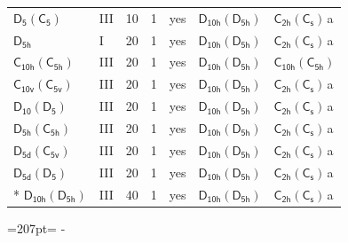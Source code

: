 \documentclass[10pt,a4paper]{article}
\newcommand{\needspace}[1]{\par\penalty-100\begingroup\dimen0=#1\relax\dimen2=\pagegoal
  \advance\dimen2-\pagetotal\ifdim\dimen0>\dimen2\relax\ifdim\dimen2>0pt\vfil\break\fi\fi
  \endgroup}
\numberwithin{equation}{section}
\newcommand{\grp}[1]{\mathsf{#1}}
\newcommand{\clsletter}[1]{\,{\scriptsize\color{black!55}#1}}
\begin{document}
{\begin{longtable}{@{}llrrlll@{}}
\href{D5-C5.pdf}{$\grp{D_{5}}(\grp{C_{5}})$} & III & 10 & 1 & yes & \href{D10h-D5h.pdf}{$\grp{D_{10h}}(\grp{D_{5h}})$} & \href{C2h-C1v.pdf}{$\grp{C_{2h}}(\grp{C_{s}})$}\clsletter{a}\\
\href{../../../rotation/data/pdf/D5h.pdf}{$\grp{D_{5h}}$} & I & 20 & 1 & yes & \href{D10h-D5h.pdf}{$\grp{D_{10h}}(\grp{D_{5h}})$} & \href{C2h-C1v.pdf}{$\grp{C_{2h}}(\grp{C_{s}})$}\clsletter{a}\\
\href{C10h-C5h.pdf}{$\grp{C_{10h}}(\grp{C_{5h}})$} & III & 20 & 1 & yes & \href{D10h-D5h.pdf}{$\grp{D_{10h}}(\grp{D_{5h}})$} & \href{C10h-C5h.pdf}{$\grp{C_{10h}}(\grp{C_{5h}})$}\\
\href{C10v-C5v.pdf}{$\grp{C_{10v}}(\grp{C_{5v}})$} & III & 20 & 1 & yes & \href{D10h-D5h.pdf}{$\grp{D_{10h}}(\grp{D_{5h}})$} & \href{C2h-C1v.pdf}{$\grp{C_{2h}}(\grp{C_{s}})$}\clsletter{a}\\
\href{D10-D5.pdf}{$\grp{D_{10}}(\grp{D_{5}})$} & III & 20 & 1 & yes & \href{D10h-D5h.pdf}{$\grp{D_{10h}}(\grp{D_{5h}})$} & \href{C2h-C1v.pdf}{$\grp{C_{2h}}(\grp{C_{s}})$}\clsletter{a}\\
\href{D5h-C5h.pdf}{$\grp{D_{5h}}(\grp{C_{5h}})$} & III & 20 & 1 & yes & \href{D10h-D5h.pdf}{$\grp{D_{10h}}(\grp{D_{5h}})$} & \href{C2h-C1v.pdf}{$\grp{C_{2h}}(\grp{C_{s}})$}\clsletter{a}\\
\href{D5d-C5v.pdf}{$\grp{D_{5d}}(\grp{C_{5v}})$} & III & 20 & 1 & yes & \href{D10h-D5h.pdf}{$\grp{D_{10h}}(\grp{D_{5h}})$} & \href{C2h-C1v.pdf}{$\grp{C_{2h}}(\grp{C_{s}})$}\clsletter{a}\\
\href{D5d-D5.pdf}{$\grp{D_{5d}}(\grp{D_{5}})$} & III & 20 & 1 & yes & \href{D10h-D5h.pdf}{$\grp{D_{10h}}(\grp{D_{5h}})$} & \href{C2h-C1v.pdf}{$\grp{C_{2h}}(\grp{C_{s}})$}\clsletter{a}\\*
\href{D10h-D5h.pdf}{$\grp{D_{10h}}(\grp{D_{5h}})$} & III & 40 & 1 & yes & \href{D10h-D5h.pdf}{$\grp{D_{10h}}(\grp{D_{5h}})$} & \href{C2h-C1v.pdf}{$\grp{C_{2h}}(\grp{C_{s}})$}\clsletter{a}\\
\bottomrule\end{longtable}}
\needspace{207pt}
\end{document}
